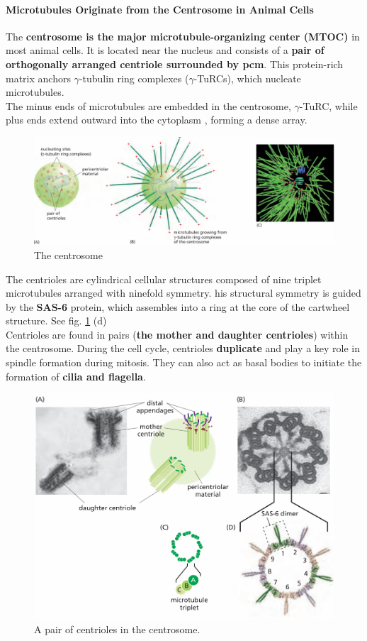 \documentclass[../main.tex]{subfiles}
\begin{document}
\paragraph{Microtubules Originate from the Centrosome in Animal Cells}
The \textbf{\gls{centrosome} is the major microtubule-organizing center (MTOC)} in most animal cells. It is located near the nucleus and consists of a \textbf{pair of orthogonally arranged \gls{centriole} surrounded by \gls{pcm}}.  This protein-rich matrix anchors $\gamma$-tubulin ring complexes ($\gamma$-TuRCs), which nucleate microtubules. \\
\indent The minus ends of microtubules are embedded in the centrosome, $\gamma$-TuRC, while plus ends extend outward into the cytoplasm , forming a dense array.
\begin{figure}[H]
	\centering
	\includegraphics[width = 0.7 \textwidth]{26}
	\caption{The centrosome}
\end{figure}

The centrioles are cylindrical cellular structures composed of nine triplet microtubules arranged with ninefold symmetry. his structural symmetry is guided by the \textbf{\gls{SAS-6}} protein, which assembles into a ring at the core of the cartwheel structure. See fig. \ref{pairOfcentrioles} (d)\\
\indent Centrioles are found in pairs (\textbf{the mother and daughter centrioles}) within the centrosome. During the cell cycle, centrioles \textbf{duplicate} and play a key role in spindle formation during mitosis. They can also act as basal bodies to initiate the formation of \textbf{cilia and flagella}. 

\begin{figure}[H]
	\centering
	\includegraphics[width = 0.7 \textwidth]{27}
	\caption{A pair of centrioles in the centrosome.}
	\label{pairOfcentrioles}
\end{figure}
\end{document}
